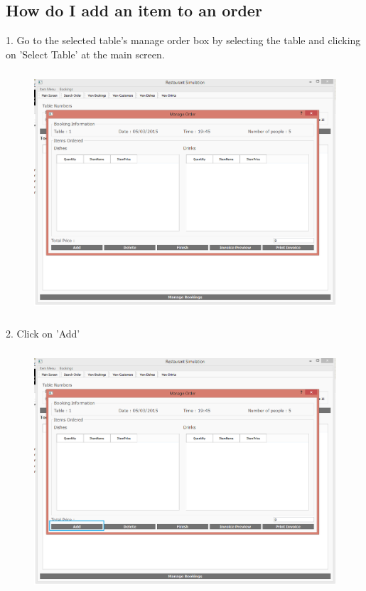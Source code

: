 \newpage
\subsection{How do I add an item to an order}

1. Go to the selected table's manage order box by selecting the table and clicking on 'Select Table' at the main screen.

\begin{figure}[H]
    \includegraphics[height = 9cm]{./Manual/images/base/ManageOrder} 
    \caption{} \label{fig:additemorder1}
\end{figure}

2. Click on 'Add'

\begin{figure}[H]
    \includegraphics[height = 9cm]{./Manual/images/AddItemOrder1} 
    \caption{} \label{fig:additemorder2}
\end{figure}

